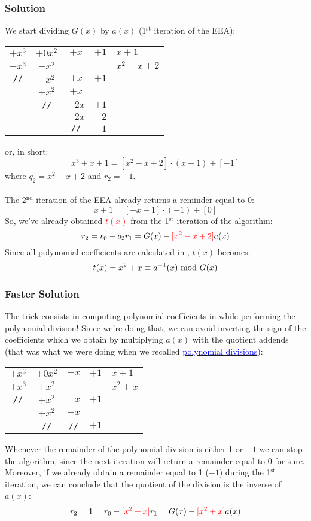 \subsubsection*{Solution}
We start dividing $G(x)$ by $a(x)$ (1$^\text{st}$ iteration of the EEA):
\begin{center}
    \begin{tabular}{cccc|l}
         $+x^3$&$+0x^2$&$+x$&$+1$&$x+1$\\
         \cline{5-5}
         $-x^3$&$-x^2$&&&$x^2-x+2$\\
         \cline{1-4}
         \texttt{//}&$-x^2$&$+x$&$+1$&\\
         &$+x^2$&$+x$&&\\
         \cline{2-4}
         &\texttt{//}&$+2x$&$+1$&\\
         &&$-2x$&$-2$&\\
         \cline{3-4}
         &&\texttt{//}&$-1$&
    \end{tabular}
\end{center}
or, in short:
$$x^3+x+1=[x^2-x+2]\cdot(x+1)+[-1]$$
where $q_2=x^2-x+2$ and $r_2=-1$.\\\\
The 2$^\text{nd}$ iteration of the EEA already returns a reminder equal to 0:
$$x+1=[-x-1]\cdot(-1)+[0]$$
So, we've already obtained \textcolor{red}{$t(x)$} from the 1$^\text{st}$ iteration of the algorithm:
$$r_2=r_0-q_2r_1=G(x)-\textcolor{red}{[x^2-x+2]}a(x)$$
Since all polynomial coefficients are calculated in , $t(x)$ becomes:
$$t(x)=x^2+x\equiv a^{-1}(x)\text{ mod } G(x)$$
\subsubsection*{Faster Solution}
The trick consists in computing polynomial coefficients in  while performing the polynomial division! Since we're doing that, we can avoid inverting the sign of the coefficients which we obtain by multiplying $a(x)$ with the quotient addends (that was what we were doing when we recalled \hyperlink{polDiv}{\textcolor{blue}{polynomial divisions}}):
\begin{center}
    \begin{tabular}{cccc|l}
         $+x^3$&$+0x^2$&$+x$&$+1$&$x+1$\\
         \cline{5-5}
         $+x^3$&$+x^2$&&&$x^2+x$\\
         \cline{1-4}
         \texttt{//}&$+x^2$&$+x$&$+1$&\\
         &$+x^2$&$+x$&&\\
         \cline{2-4}
         &\texttt{//}&\texttt{//}&$+1$&
    \end{tabular}
\end{center}
Whenever the remainder of the polynomial division is either 1 or $-1$ we can stop the algorithm, since the next iteration will return a remainder equal to 0 for sure. Moreover, if we already obtain a remainder equal to 1 ($-1$) during the 1$^{\text{st}}$ iteration, we can conclude that the quotient of the division is the inverse of $a(x)$:
$$r_2=1=r_0-\textcolor{red}{[x^2+x]}r_1=G(x)-\textcolor{red}{[x^2+x]}a(x)$$

